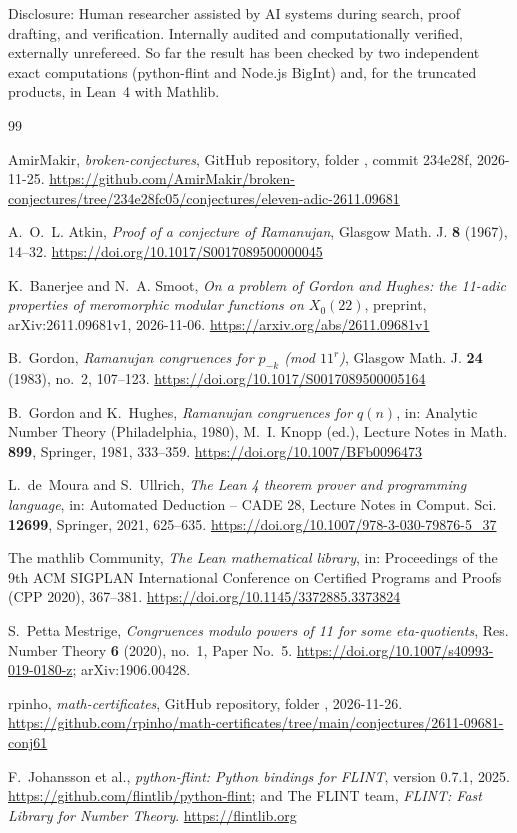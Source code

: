 \documentclass[11pt]{amsart}
\theoremstyle{definition}
\theoremstyle{remark}
\begin{document}
Disclosure: Human researcher assisted by AI systems during search, proof drafting, and verification. Internally audited and computationally verified, externally unrefereed. So far the result has been checked by two independent exact computations (python-flint and Node.js BigInt) and, for the truncated products, in Lean~4 with Mathlib.

\begin{thebibliography}{99}

AmirMakir, \emph{broken-conjectures}, GitHub repository, folder , commit 234e28f, 2026-11-25. \url{https://github.com/AmirMakir/broken-conjectures/tree/234e28fc05/conjectures/eleven-adic-2611.09681}

A.~O.~L. Atkin, \emph{Proof of a conjecture of Ramanujan}, Glasgow Math. J. \textbf{8} (1967), 14--32. \url{https://doi.org/10.1017/S0017089500000045}

K.~Banerjee and N.~A. Smoot, \emph{On a problem of Gordon and Hughes: the 11-adic properties of meromorphic modular functions on \(X_0(22)\)}, preprint, arXiv:2611.09681v1, 2026-11-06. \url{https://arxiv.org/abs/2611.09681v1}

B.~Gordon, \emph{Ramanujan congruences for \(p_{-k}\) (mod \(11^r\))}, Glasgow Math. J. \textbf{24} (1983), no.~2, 107--123. \url{https://doi.org/10.1017/S0017089500005164}

B.~Gordon and K.~Hughes, \emph{Ramanujan congruences for \(q(n)\)}, in: Analytic Number Theory (Philadelphia, 1980), M.~I. Knopp (ed.), Lecture Notes in Math. \textbf{899}, Springer, 1981, 333--359. \url{https://doi.org/10.1007/BFb0096473}

L.~de~Moura and S.~Ullrich, \emph{The Lean 4 theorem prover and programming language}, in: Automated Deduction -- CADE 28, Lecture Notes in Comput. Sci. \textbf{12699}, Springer, 2021, 625--635. \url{https://doi.org/10.1007/978-3-030-79876-5_37}

The mathlib Community, \emph{The Lean mathematical library}, in: Proceedings of the 9th ACM SIGPLAN International Conference on Certified Programs and Proofs (CPP 2020), 367--381. \url{https://doi.org/10.1145/3372885.3373824}

S.~Petta Mestrige, \emph{Congruences modulo powers of 11 for some eta-quotients}, Res. Number Theory \textbf{6} (2020), no.~1, Paper No.~5. \url{https://doi.org/10.1007/s40993-019-0180-z}; arXiv:1906.00428.

rpinho, \emph{math-certificates}, GitHub repository, folder , 2026-11-26. \url{https://github.com/rpinho/math-certificates/tree/main/conjectures/2611-09681-conj61}

F.~Johansson et al., \emph{python-flint: Python bindings for FLINT}, version 0.7.1, 2025. \url{https://github.com/flintlib/python-flint}; and The FLINT team, \emph{FLINT: Fast Library for Number Theory}. \url{https://flintlib.org}

\end{thebibliography}
\end{document}
